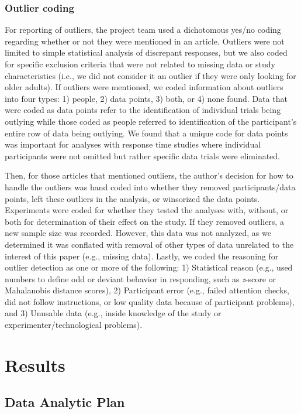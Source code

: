 \documentclass[english,,man]{apa6}
\theoremstyle{definition}
\theoremstyle{definition}
\theoremstyle{definition}
\theoremstyle{remark}
\begin{document}
\subsubsection{Outlier coding}\label{outlier-coding}

For reporting of outliers, the project team used a dichotomous yes/no
coding regarding whether or not they were mentioned in an article.
Outliers were not limited to simple statistical analysis of discrepant
responses, but we also coded for specific exclusion criteria that were
not related to missing data or study characteristics (i.e., we did not
consider it an outlier if they were only looking for older adults). If
outliers were mentioned, we coded information about outliers into four
types: 1) people, 2) data points, 3) both, or 4) none found. Data that
were coded as data points refer to the identification of individual
trials being outlying while those coded as people referred to
identification of the participant's entire row of data being outlying.
We found that a unique code for data points was important for analyses
with response time studies where individual participants were not
omitted but rather specific data trials were eliminated.

Then, for those articles that mentioned outliers, the author's decision
for how to handle the outliers was hand coded into whether they removed
participants/data points, left these outliers in the analysis, or
winsorized the data points. Experiments were coded for whether they
tested the analyses with, without, or both for determination of their
effect on the study. If they removed outliers, a new sample size was
recorded. However, this data was not analyzed, as we determined it was
conflated with removal of other types of data unrelated to the interest
of this paper (e.g., missing data). Lastly, we coded the reasoning for
outlier detection as one or more of the following: 1) Statistical reason
(e.g., used numbers to define odd or deviant behavior in responding,
such as \emph{z}-score or Mahalanobis distance scores), 2) Participant
error (e.g., failed attention checks, did not follow instructions, or
low quality data because of participant problems), and 3) Unusable data
(e.g., inside knowledge of the study or experimenter/technological
problems).

\section{Results}\label{results}

\subsection{Data Analytic Plan}\label{data-analytic-plan}
\end{document}
